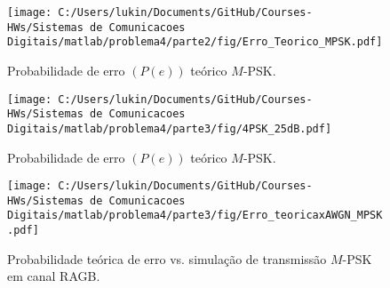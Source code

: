 \begin{figure}[!ht]
    \centering
    \texttt{[image: C:/Users/lukin/Documents/GitHub/Courses-HWs/Sistemas de Comunicacoes Digitais/matlab/problema4/parte2/fig/Erro\_Teorico\_MPSK.pdf]}
    \caption{Probabilidade de erro $(P(e))$ teórico $M$-PSK.}
    \label{fig:Erro_Teorico_MPSK}
\end{figure}


\begin{figure}[!ht]
    \centering
    \texttt{[image: C:/Users/lukin/Documents/GitHub/Courses-HWs/Sistemas de Comunicacoes Digitais/matlab/problema4/parte3/fig/4PSK\_25dB.pdf]}
    \caption{Probabilidade de erro $(P(e))$ teórico $M$-PSK.}
    \label{fig:4PSK_25dB}
\end{figure}

\begin{figure}[!ht]
    \centering
    \texttt{[image: C:/Users/lukin/Documents/GitHub/Courses-HWs/Sistemas de Comunicacoes Digitais/matlab/problema4/parte3/fig/Erro\_teoricaxAWGN\_MPSK.pdf]}
    \caption{Probabilidade teórica de erro vs. simulação de transmissão $M$-PSK em canal RAGB.}
    \label{fig:Erro_teoricaxAWGN_MPSK}
\end{figure}

